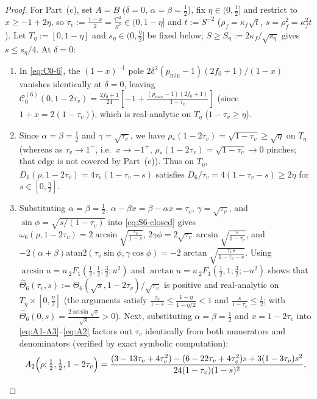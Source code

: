 \documentclass[11pt]{article}
\theoremstyle{definition}
\theoremstyle{remark}
\newcommand{\cC}{\mathcal{C}}
\newcommand{\atanTwo}{\mathrm{atan2}}
\renewcommand{\_}{\oldunderscore\penalty0\hskip0pt\relax}
\begin{document}
\begin{proof}
For Part~(c), set $A=B$ ($\delta=0$, $\alpha=\beta=\frac12$), fix $\eta\in(0,\frac12]$ and restrict to $x\ge -1+2\eta$, so
  $\tau_v:=\frac{1-x}{2}=\frac{C^2}{S^2}\in(0,1-\eta]$ and $t:=S^{-2}$ ($\rho_f=\kappa_f\sqrt{t}$, $s=\rho_f^2=\kappa_f^2 t$).
  Let $T_\eta:=[0,1-\eta]$ and $s_\eta\in(0,\frac\eta2]$ be fixed below; $S\ge S_\eta:=2\kappa_f/\sqrt{s_\eta}$ gives $s\le s_\eta/4$.
  At $\delta=0$:
\begin{enumerate}[leftmargin=2em,itemsep=2pt]
\item In \eqref{eq:C0-6}, the $(1-x)^{-1}$ pole $2\delta^2(p_{\min}-1)(2f_0+1)/(1-x)$ vanishes identically at $\delta=0$, leaving
  $\cC_0^{(6)}(0,1-2\tau_v)=\frac{2f_0+1}{24}[-1+\frac{(p_{\max}-1)(2f_0+1)}{1-\tau_v}]$ (since $1+x=2(1-\tau_v)$), which is real-analytic on
  $T_\eta$ ($1-\tau_v\ge\eta$).
\item Since $\alpha=\beta=\frac12$ and $\gamma=\sqrt{\tau_v}$, we have $\rho_*(1-2\tau_v)=\sqrt{1-\tau_v}\ge\sqrt\eta$
  on $T_\eta$ (whereas as $\tau_v\to 1^-$, i.e.\ $x\to -1^+$, $\rho_*(1-2\tau_v)=\sqrt{1-\tau_v}\to 0$ pinches;
  that edge is not covered by Part~(c)). Thus on $T_\eta$, $D_6(\rho,1-2\tau_v)=4\tau_v(1-\tau_v-s)$
  satisfies $D_6/\tau_v=4(1-\tau_v-s)\ge 2\eta$ for $s\in[0,\frac\eta2]$.
\item Substituting $\alpha=\beta=\frac12$, $\alpha-\beta x=\beta-\alpha x=\tau_v$, $\gamma=\sqrt{\tau_v}$, and
  $\sin\phi=\sqrt{s/(1-\tau_v)}$ into \eqref{eq:S6-closed} gives $\omega_6(\rho,1-2\tau_v)=2\arcsin\sqrt{\frac{\tau_v}{1-s}}$,
  $2\gamma\phi=2\sqrt{\tau_v}\arcsin\sqrt{\frac{s}{1-\tau_v}}$, and
  $-2(\alpha+\beta)\atanTwo(\tau_v\sin\phi,\gamma\cos\phi)=-2\arctan\sqrt{\frac{\tau_v s}{1-\tau_v-s}}$. Using $\arcsin
  u=u\,{}_2F_1(\frac12,\frac12;\frac32;u^2)$ and $\arctan u=u\,{}_2F_1(\frac12,1;\frac32;-u^2)$ shows that
  $\widehat{\Theta}_6(\tau_v,s):=\Theta_6(\sqrt{s},1-2\tau_v)/\sqrt{\tau_v}$ is positive and real-analytic on
  $T_\eta\times[0,\frac\eta2]$ (the arguments satisfy $\frac{\tau_v}{1-s}\le\frac{1-\eta}{1-\eta/2}<1$ and $\frac{s}{1-\tau_v}\le\frac12$; with $\widehat{\Theta}_6(0,s)=\frac{2\arcsin\sqrt{s}}{\sqrt{s}}>0$). Next, substituting
  $\alpha=\beta=\frac12$ and $x=1-2\tau_v$ into \eqref{eq:A1-A3}--\eqref{eq:A2} factors out $\tau_v$ identically from both
  numerators and denominators (verified by exact symbolic computation):
\begin{equation}
  \begin{gathered}
  A_2\Bigl(\rho;\tfrac12,\tfrac12,1-2\tau_v\Bigr) = \frac{(3-13\tau_v+4\tau_v^2)-(6-22\tau_v+4\tau_v^2)s+3(1-3\tau_v)s^2}{24(1-\tau_v)(1-s)^2},\\

\end{gathered}
\end{equation}
\end{enumerate}
\end{proof}
\end{document}
